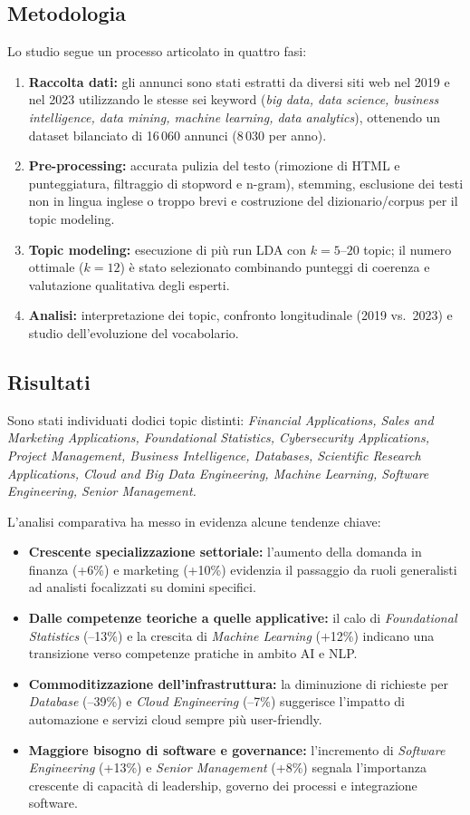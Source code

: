 \subsection{Metodologia}
Lo studio segue un processo articolato in quattro fasi:
\begin{enumerate}
    \item \textbf{Raccolta dati:} gli annunci sono stati estratti da diversi siti web nel 2019 e nel 2023 utilizzando le stesse sei keyword (\textit{big data, data science, business intelligence, data mining, machine learning, data analytics}), ottenendo un dataset bilanciato di 16\,060 annunci (8\,030 per anno).
    \item \textbf{Pre-processing:} accurata pulizia del testo (rimozione di HTML e punteggiatura, filtraggio di stopword e n-gram), stemming, esclusione dei testi non in lingua inglese o troppo brevi e costruzione del dizionario/corpus per il topic modeling.
    \item \textbf{Topic modeling:} esecuzione di più run LDA con $k=5$--$20$ topic; il numero ottimale ($k=12$) è stato selezionato combinando punteggi di coerenza e valutazione qualitativa degli esperti.
    \item \textbf{Analisi:} interpretazione dei topic, confronto longitudinale (2019 vs.\ 2023) e studio dell'evoluzione del vocabolario.
\end{enumerate}

\subsection{Risultati}
Sono stati individuati dodici topic distinti:
\textit{Financial Applications, Sales and Marketing Applications, Foundational Statistics, Cybersecurity Applications, Project Management, Business Intelligence, Databases, Scientific Research Applications, Cloud and Big Data Engineering, Machine Learning, Software Engineering, Senior Management.}

\noindent L'analisi comparativa ha messo in evidenza alcune tendenze chiave:
\begin{itemize}
    \item \textbf{Crescente specializzazione settoriale:} l'aumento della domanda in finanza (+6\%) e marketing (+10\%) evidenzia il passaggio da ruoli generalisti ad analisti focalizzati su domini specifici.
    \item \textbf{Dalle competenze teoriche a quelle applicative:} il calo di \textit{Foundational Statistics} (--13\%) e la crescita di \textit{Machine Learning} (+12\%) indicano una transizione verso competenze pratiche in ambito AI e NLP.
    \item \textbf{Commoditizzazione dell'infrastruttura:} la diminuzione di richieste per \textit{Database} (--39\%) e \textit{Cloud Engineering} (--7\%) suggerisce l'impatto di automazione e servizi cloud sempre più user-friendly.
    \item \textbf{Maggiore bisogno di software e governance:} l'incremento di \textit{Software Engineering} (+13\%) e \textit{Senior Management} (+8\%) segnala l'importanza crescente di capacità di leadership, governo dei processi e integrazione software.
\end{itemize}


